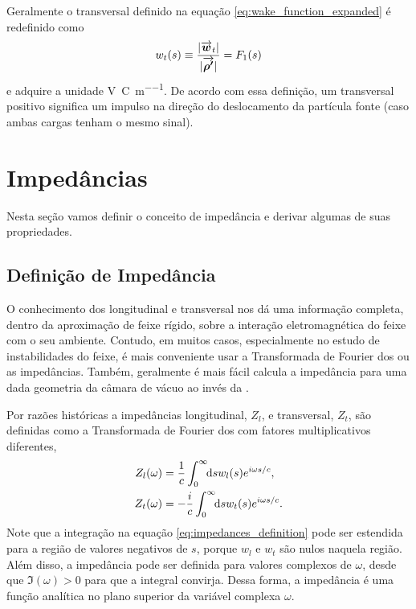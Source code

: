 Geralmente o  transversal definido na equação \eqref{eq:wake_function_expanded} é redefinido como
\begin{equation}
	w_t(s) \equiv \frac{|\vect{w}_t|}{|\vect{\rho'}|} = F_1(s)
\end{equation}
e adquire a unidade \si{\volt\per\coulomb\per\meter}. De acordo com essa definição, um  transversal positivo significa um impulso na direção do deslocamento da partícula fonte (caso ambas cargas tenham o mesmo sinal).


\section{Impedâncias}

Nesta seção vamos definir o conceito de impedância e derivar algumas de suas propriedades.

\subsection{Definição de Impedância}
O conhecimento dos  longitudinal e transversal nos dá uma informação completa, dentro da aproximação de feixe rígido, sobre a interação eletromagnética do feixe com o seu ambiente. Contudo, em muitos casos, especialmente no estudo de instabilidades do feixe, é mais conveniente usar a Transformada de Fourier dos  ou as impedâncias. Também, geralmente é mais fácil calcula a impedância para uma dada geometria da câmara de vácuo ao invés da .

Por razões históricas a impedâncias longitudinal, $Z_l$, e transversal, $Z_t$, são definidas como a Transformada de Fourier dos  com fatores multiplicativos diferentes,
\begin{equation}\label{eq:impedances_definition}\begin{aligned}
Z_l(\omega) &= \frac1c \defint{s}{w_l(s)e^{i\omega s/c}}{0}{\infty},\\
Z_t(\omega) &= -\frac{i}{c} \defint{s}{w_t(s)e^{i\omega s/c}}{0}{\infty}.
\end{aligned}\end{equation}
Note que a integração na equação \eqref{eq:impedances_definition} pode ser estendida para a região de valores negativos de $s$, porque $w_l$ e $w_t$ são nulos naquela região. Além disso, a impedância pode ser definida para valores complexos de $\omega$, desde que $\Im(\omega) > 0 $ para que a integral convirja. Dessa forma, a impedância é uma função analítica no plano superior da variável complexa $\omega$.

